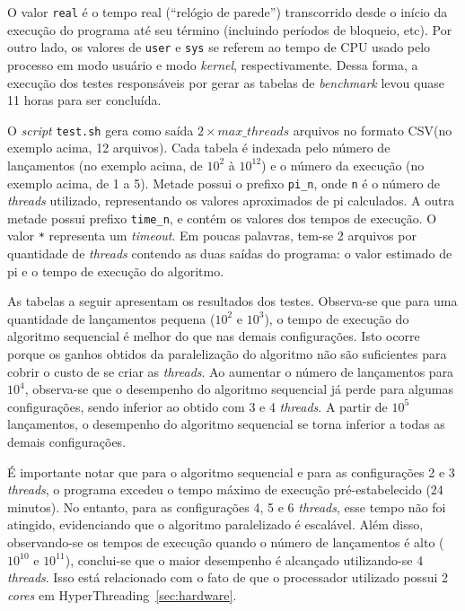 \documentclass[12pt,a4paper]{article}
\begin{document}
O valor \texttt{real} é o tempo real (``relógio de parede'') transcorrido desde
o início da execução do programa até seu término (incluindo períodos de
bloqueio, etc). Por outro lado, os valores de \texttt{user} e \texttt{sys} se
referem ao tempo de CPU usado pelo processo em modo usuário e modo
\textit{kernel}, respectivamente. Dessa forma, a execução dos testes
responsáveis por gerar as tabelas de \textit{benchmark} levou quase 11 horas
para ser concluída.

O \textit{script} \texttt{test.sh} gera como saída $2 \times max\_threads$
arquivos no formato CSV\@ (no exemplo acima, 12 arquivos). Cada tabela é
indexada pelo número de lançamentos (no exemplo acima, de $10^2$ à $10^{12}$) e
o número da execução (no exemplo acima, de 1 a 5).  Metade possui o prefixo
\texttt{pi\_{n}}, onde \texttt{n} é o número de \textit{threads} utilizado,
representando os valores aproximados de pi calculados. A outra metade possui
prefixo \texttt{time\_{n}}, e contém os valores dos tempos de execução. O valor
\texttt{*} representa um \textit{timeout}. Em poucas palavras, tem-se 2 arquivos
por quantidade de \textit{threads} contendo as duas saídas do programa: o valor
estimado de pi e o tempo de execução do algoritmo.

As tabelas a seguir apresentam os resultados dos testes. Observa-se que para uma
quantidade de lançamentos pequena ($10^2$ e $10^3$), o tempo de execução do
algoritmo sequencial é melhor do que nas demais configurações. Isto ocorre
porque os ganhos obtidos da paralelização do algoritmo não são suficientes para
cobrir o custo de se criar as \textit{threads}. Ao aumentar o número
de lançamentos para $10^4$, observa-se que o desempenho do algoritmo sequencial
já perde para algumas configurações, sendo inferior ao obtido com 3 e 4
\textit{threads}. A partir de $10^5$ lançamentos, o desempenho do algoritmo
sequencial se torna inferior a todas as demais configurações.

É importante notar que para o algoritmo sequencial e para as configurações 2 e 3
\textit{threads}, o programa excedeu o tempo máximo de execução pré-estabelecido
(24 minutos). No entanto, para as configurações 4, 5 e 6 \textit{threads}, esse
tempo não foi atingido, evidenciando que o algoritmo paralelizado é escalável.
Além disso, observando-se os tempos de execução quando o número de lançamentos é
alto ($10^{10}$ e $10^{11}$), conclui-se que o maior desempenho é alcançado
utilizando-se 4 \textit{threads}. Isso está relacionado com o fato de que o
processador utilizado possui 2 \textit{cores} em
HyperThreading~\ref{sec:hardware}.
\end{document}
